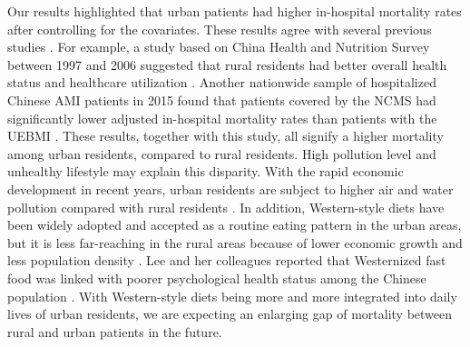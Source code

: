 \documentclass[ijerph,article,submit,moreauthors,pdftex,10pt,a4paper]{mdpi}
\theoremstyle{mdpi}
\newcounter{ex}
\newcounter{re}
\theoremstyle{mdpidefinition}
\begin{document}
Our results highlighted that urban patients had higher in-hospital mortality rates after controlling for the covariates. These results agree with several previous studies \cite{fang2009explaining, chen2018geographic, zhang2014urban}. For example, a study based on China Health and Nutrition Survey between 1997 and 2006 suggested that rural residents had better overall health status and healthcare utilization \cite{fang2009explaining}. Another nationwide sample of hospitalized Chinese AMI patients in 2015 found that patients covered by the NCMS had significantly lower adjusted in-hospital mortality rates than patients with the UEBMI \cite{chen2018geographic}. These results, together with this study, all signify a higher mortality among urban residents, compared to rural residents. High pollution level and unhealthy lifestyle may explain this disparity. With the rapid economic development in recent years, urban residents are subject to higher air and water pollution compared with rural residents \cite{gong2012urbanisation}. In addition, Western-style diets have been widely adopted and accepted as a routine eating pattern in the urban areas, but it is less far-reaching in the rural areas because of lower economic growth and less population density \cite{pingali2007westernization}. Lee and her colleagues reported that Westernized fast food was linked with poorer psychological health status among the Chinese population \cite{lee2018assessing}. With Western-style diets being more and more integrated into daily lives of urban residents, we are expecting an enlarging gap of mortality between rural and urban patients in the future.
\end{document}
